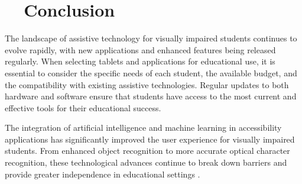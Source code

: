 \section{~~Conclusion}
\label{sec:conclusion-tablets}
The landscape of assistive technology for visually impaired students continues to evolve rapidly, with new applications and enhanced features being released regularly. When selecting tablets and applications for educational use, it is essential to consider the specific needs of each student, the available budget, and the compatibility with existing assistive technologies. Regular updates to both hardware and software ensure that students have access to the most current and effective tools for their educational success.

The integration of artificial intelligence and machine learning in accessibility applications has significantly improved the user experience for visually impaired students. From enhanced object recognition to more accurate optical character recognition, these technological advances continue to break down barriers and provide greater independence in educational settings \supercite{Bigham2014}.

